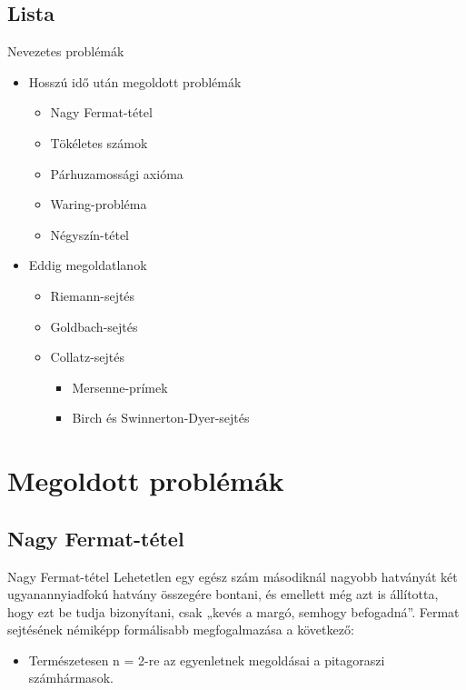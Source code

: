 \documentclass{beamer}
\theoremstyle{definition}
\begin{document}
\subsection{Lista}
\begin{frame}{Nevezetes problémák}
\transblindshorizontal
\begin{itemize}
    \item Hosszú idő után megoldott problémák
    \begin{itemize}
        \item Nagy Fermat-tétel
        \item Tökéletes számok
        \item Párhuzamossági axióma
        \item Waring-probléma
        \item Négyszín-tétel
    \end{itemize}
    \item Eddig megoldatlanok
    \begin{itemize}
        \item Riemann-sejtés
        \item Goldbach-sejtés
        \item Collatz-sejtés
            \begin{itemize}
                \item Mersenne-prímek
                \item Birch és Swinnerton-Dyer-sejtés
            \end{itemize}
    \end{itemize}
\end{itemize}
\end{frame}
\section{Megoldott problémák}
\subsection{Nagy Fermat-tétel}
\begin{frame}{Nagy Fermat-tétel}
\transblindsvertical
   Lehetetlen egy egész szám másodiknál nagyobb hatványát két ugyanannyiadfokú hatvány összegére bontani, és emellett még azt is állította, hogy ezt be tudja bizonyítani, csak „kevés a margó, semhogy befogadná”. Fermat sejtésének némiképp formálisabb megfogalmazása a következő:

    \begin{itemize}
        \pause
        \pause
        \item Természetesen n = 2-re az egyenletnek megoldásai a pitagoraszi számhármasok.
    \end{itemize}
\end{frame}
\end{document}
